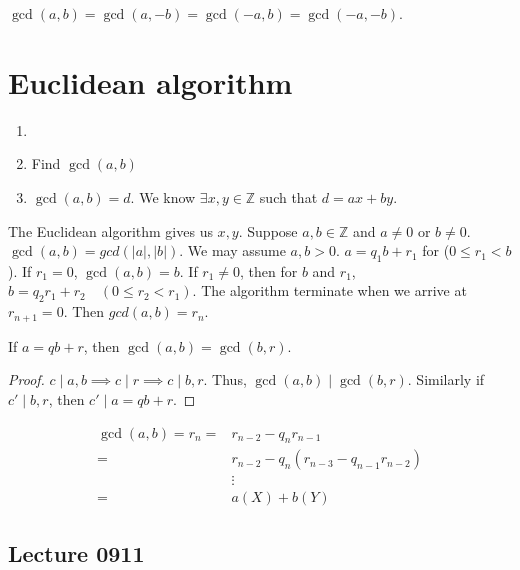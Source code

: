 \documentclass{article}
\begin{document}
\begin{multicols}{2}
\begin{example}
$\gcd(a,b)=\gcd(a,-b)=\gcd(-a,b)=\gcd(-a,-b)$.
\end{example}

\section{Euclidean algorithm}

\begin{example}
\begin{enumerate}[label={(\alph*)}]
\item[]
\item Find $\gcd(a,b)$
\item $\gcd(a,b)=d$. We know $\exists x,y\in \mathbb{Z}$ such that $d=ax+by$.
\end{enumerate}
The Euclidean algorithm gives us $x,y$.
Suppose $a,b\in \mathbb{Z}$ and $a\neq 0$ or $b\neq 0$. $\gcd(a,b)=gcd(|a|,|b|)$. We may assume $a,b>0$. $a=q_1b+r_1$ for ($0\leq r_1<b$). If $r_1=0$, $\gcd(a,b)=b$. If $r_1\neq 0$, then for $b$ and $r_1$, $b=q_2r_1+r_2\quad(0\leq r_2<r_1)$. The algorithm terminate when we arrive at $r_{n+1}=0$. Then $gcd(a,b)=r_n$.        
\end{example}

\begin{mytheorem}
If $a=qb+r$, then $\gcd(a,b)=\gcd(b,r)$.
\end{mytheorem}
\begin{proof}
$c\mid a,b \implies c\mid r \implies c\mid b,r$. Thus, $\gcd(a,b)\mid \gcd(b,r)$. Similarly if $c'\mid b,r$, then $c'\mid a=qb+r$.
\end{proof}

\begin{example}
    \begin{align}
        \gcd(a,b)=r_n=& r_{n-2}-q_nr_{n-1}\\
        =&r_{n-2}-q_n(r_{n-3}-q_{n-1}r_{n-2})\\
        &\vdots\\
        =&a(X) + b(Y)
    \end{align}
\end{example}

\subsection{Lecture 0911}


\clearpage
\end{multicols}
\end{document}
